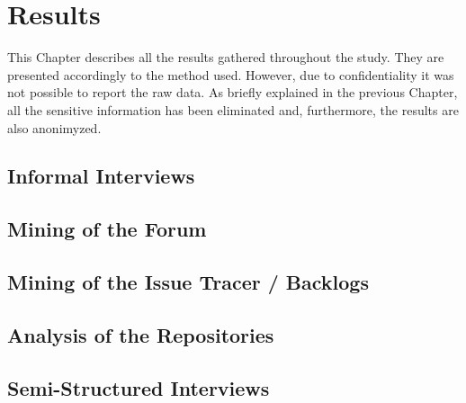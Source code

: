 \chapter{Results}

This Chapter describes all the results gathered throughout the study. They are presented accordingly to the method used. However, due to confidentiality it was not possible to report the raw data. As briefly explained in the previous Chapter, all the sensitive information has been eliminated and, furthermore, the results are also anonimyzed.

\section{Informal Interviews}

\section{Mining of the Forum}

\section{Mining of the Issue Tracer / Backlogs}

\section{Analysis of the Repositories}

\section{Semi-Structured Interviews}